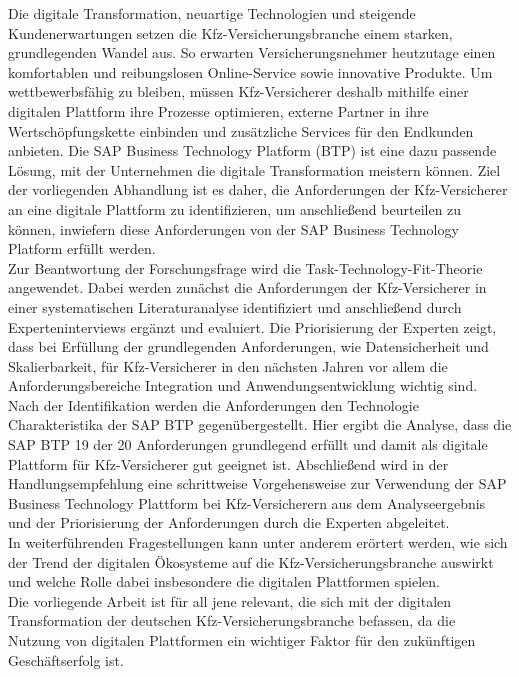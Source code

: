 Die digitale Transformation, neuartige Technologien und steigende Kundenerwartungen setzen die Kfz-Versicherungsbranche einem starken, grundlegenden Wandel aus. So erwarten Versicherungsnehmer heutzutage einen komfortablen und reibungslosen Online-Service sowie innovative Produkte. Um wettbewerbsfähig zu bleiben, müssen Kfz-Versicherer deshalb mithilfe einer digitalen Plattform ihre Prozesse optimieren, externe Partner in ihre Wertschöpfungskette einbinden und zusätzliche Services für den Endkunden anbieten. Die SAP Business Technology Platform (BTP) ist eine dazu passende Lösung, mit der Unternehmen die digitale Transformation meistern können. Ziel der vorliegenden Abhandlung ist es daher, die Anforderungen der Kfz-Versicherer an eine digitale Plattform zu identifizieren, um anschließend beurteilen zu können, inwiefern diese Anforderungen von der SAP Business Technology Platform erfüllt werden.\\
Zur Beantwortung der Forschungsfrage wird die Task-Technology-Fit-Theorie angewendet. Dabei werden zunächst die Anforderungen der Kfz-Versicherer in einer systematischen Literaturanalyse identifiziert und anschließend durch Experteninterviews ergänzt und evaluiert. Die Priorisierung der Experten zeigt, dass bei Erfüllung der grundlegenden Anforderungen, wie Datensicherheit und Skalierbarkeit, für Kfz-Versicherer in den nächsten Jahren vor allem die Anforderungsbereiche Integration und Anwendungsentwicklung wichtig sind. Nach der Identifikation werden die Anforderungen den Technologie Charakteristika der SAP BTP gegenübergestellt. Hier ergibt die Analyse, dass die SAP BTP 19 der 20 Anforderungen grundlegend erfüllt und damit als digitale Plattform für Kfz-Versicherer gut geeignet ist. Abschließend wird in der Handlungsempfehlung eine schrittweise Vorgehensweise zur Verwendung der SAP Business Technology Plattform bei Kfz-Versicherern aus dem Analyseergebnis und der Priorisierung der Anforderungen durch die Experten abgeleitet. \\
In weiterführenden Fragestellungen kann unter anderem erörtert werden, wie sich der Trend der digitalen Ökosysteme auf die Kfz-Versicherungsbranche auswirkt und welche Rolle dabei insbesondere die digitalen Plattformen spielen.\\
Die vorliegende Arbeit ist für all jene relevant, die sich mit der digitalen Transformation der deutschen Kfz-Versicherungsbranche befassen, da die Nutzung von digitalen Plattformen ein wichtiger Faktor für den zukünftigen Geschäftserfolg ist.



